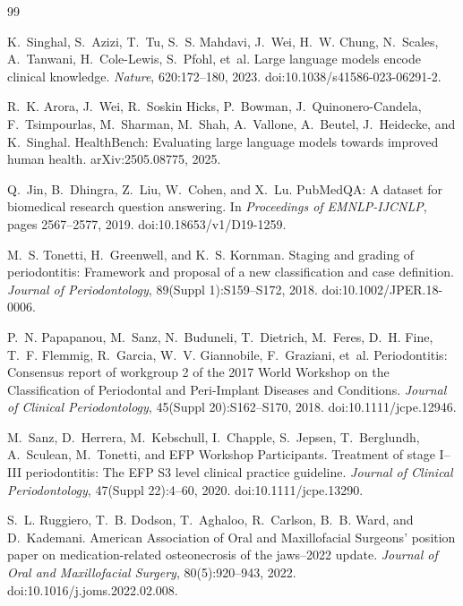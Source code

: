 \documentclass[11pt]{article}
\begin{document}
\begin{thebibliography}{99}
\raggedright

K.~Singhal, S.~Azizi, T.~Tu, S.~S. Mahdavi, J.~Wei, H.~W. Chung, N.~Scales, A.~Tanwani, H.~Cole-Lewis, S.~Pfohl, et~al.
\newblock Large language models encode clinical knowledge.
\newblock \emph{Nature}, 620:172--180, 2023.
\newblock doi:10.1038/s41586-023-06291-2.

R.~K. Arora, J.~Wei, R.~Soskin Hicks, P.~Bowman, J.~Quinonero-Candela, F.~Tsimpourlas, M.~Sharman, M.~Shah, A.~Vallone, A.~Beutel, J.~Heidecke, and K.~Singhal.
\newblock HealthBench: Evaluating large language models towards improved human health.
\newblock arXiv:2505.08775, 2025.

Q.~Jin, B.~Dhingra, Z.~Liu, W.~Cohen, and X.~Lu.
\newblock PubMedQA: A dataset for biomedical research question answering.
\newblock In \emph{Proceedings of EMNLP-IJCNLP}, pages 2567--2577, 2019.
\newblock doi:10.18653/v1/D19-1259.

M.~S. Tonetti, H.~Greenwell, and K.~S. Kornman.
\newblock Staging and grading of periodontitis: Framework and proposal of a new classification and case definition.
\newblock \emph{Journal of Periodontology}, 89(Suppl 1):S159--S172, 2018.
\newblock doi:10.1002/JPER.18-0006.

P.~N. Papapanou, M.~Sanz, N.~Buduneli, T.~Dietrich, M.~Feres, D.~H. Fine, T.~F. Flemmig, R.~Garcia, W.~V. Giannobile, F.~Graziani, et~al.
\newblock Periodontitis: Consensus report of workgroup 2 of the 2017 World Workshop on the Classification of Periodontal and Peri-Implant Diseases and Conditions.
\newblock \emph{Journal of Clinical Periodontology}, 45(Suppl 20):S162--S170, 2018.
\newblock doi:10.1111/jcpe.12946.

M.~Sanz, D.~Herrera, M.~Kebschull, I.~Chapple, S.~Jepsen, T.~Berglundh, A.~Sculean, M.~Tonetti, and EFP Workshop Participants.
\newblock Treatment of stage I--III periodontitis: The EFP S3 level clinical practice guideline.
\newblock \emph{Journal of Clinical Periodontology}, 47(Suppl 22):4--60, 2020.
\newblock doi:10.1111/jcpe.13290.

S.~L. Ruggiero, T.~B. Dodson, T.~Aghaloo, R.~Carlson, B.~B. Ward, and D.~Kademani.
\newblock American Association of Oral and Maxillofacial Surgeons' position paper on medication-related osteonecrosis of the jaws--2022 update.
\newblock \emph{Journal of Oral and Maxillofacial Surgery}, 80(5):920--943, 2022.
\newblock doi:10.1016/j.joms.2022.02.008.


\end{thebibliography}
\end{document}
